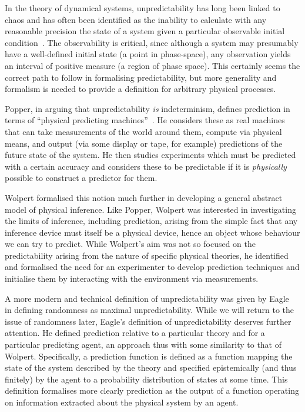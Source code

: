 \documentclass[%
 superscriptaddress,
 preprint,
 showpacs,
 showkeys,
 preprintnumbers,
 nofootinbib,
  amsmath,amssymb,
  aps,
 pra,
  longbibliography,
  floatfix,
 ]{revtex4-1}
\theoremstyle{definition}
\begin{document}
In the theory of dynamical systems, unpredictability has long been linked to chaos and has often been identified as the inability to calculate with any reasonable precision the state of a system given a particular observable initial condition~\cite{Werndl:2009nx}.
The observability is critical, since although a system may presumably have a well-defined initial state (a point in phase-space), any observation yields an interval of positive measure (a region of phase space).
This certainly seems the correct path to follow in formalising predictability, but more generality and formalism is needed to provide a definition for arbitrary physical processes.

Popper, in arguing that unpredictability \emph{is} indeterminism, defines prediction in terms of ``physical predicting machines''~\cite{popper-50i}.
He considers these as real machines that can take measurements of the world around them, compute via physical means, and output (via some display or tape, for example) predictions of the future state of the system.
He then studies experiments which must be predicted with a certain accuracy and considers these to be predictable if it is \emph{physically} possible to construct a predictor for them.

Wolpert \cite{Wolpert:2008aa} formalised this notion much further in developing a general abstract model of physical inference.
Like Popper, Wolpert was interested in investigating the limits of inference, including prediction, arising from the simple fact that any inference device must itself be a physical device,  hence an object whose behaviour we can try to predict.
While Wolpert's aim was not so focused on the predictability arising from the nature of specific physical theories, he identified and formalised the need for an experimenter to develop prediction techniques and initialise them by interacting with the environment via measurements.

A more modern and technical definition of unpredictability was given by Eagle~\cite{Eagle:2005ys} in defining randomness as maximal unpredictability.
While we will return to the issue of randomness later, Eagle's definition of unpredictability deserves further attention.
He defined prediction relative to a particular theory and for a particular predicting agent, an approach thus with some similarity to that of Wolpert.
Specifically, a prediction function is defined as a function mapping the state of the system described by the theory and specified epistemically (and thus finitely) by the agent to a probability distribution of states at some time.
This definition formalises more clearly prediction as the output of a function operating on information extracted about the physical system by an agent.
\end{document}

